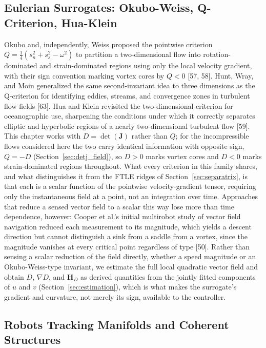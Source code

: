 \documentclass[12pt, letterpaper, oneside]{report}
\begin{document}
\subsection{Eulerian Surrogates: Okubo-Weiss, Q-Criterion, Hua-Klein}

Okubo and, independently, Weiss proposed the pointwise criterion
$Q=\tfrac14(s_n^2+s_s^2-\omega^2)$ to partition a two-dimensional flow into
rotation-dominated and strain-dominated regions using only the local
velocity gradient, with their sign convention marking vortex cores by
$Q<0$ [57, 58]. Hunt, Wray, and Moin generalized the same second-invariant
idea to three dimensions as the Q-criterion for identifying eddies,
streams, and convergence zones in turbulent flow fields [63]. Hua and Klein
revisited the two-dimensional criterion for oceanographic use, sharpening
the conditions under which it correctly separates elliptic and hyperbolic
regions of a nearly two-dimensional turbulent flow [59]. This chapter works
with $D=\det(\mathbf{J})$ rather than $Q$; for the incompressible flows
considered here the two carry identical information with opposite sign,
$Q=-D$ (Section~\ref{sec:detj_field}), so $D>0$ marks vortex cores and
$D<0$ marks strain-dominated regions throughout. What every criterion in
this family shares, and what distinguishes it from the FTLE ridges of
Section~\ref{sec:separatrix}, is that each is a scalar function of the
pointwise velocity-gradient tensor, requiring only the instantaneous field
at a point, not an integration over time. Approaches that reduce a sensed
vector field to a scalar this way lose more than time dependence, however:
Cooper et al.'s initial multirobot study of vector field navigation reduced
each measurement to its magnitude, which yields a descent direction but
cannot distinguish a sink from a saddle from a vortex, since the magnitude
vanishes at every critical point regardless of type [50]. Rather than
sensing a scalar reduction of the field directly, whether a speed magnitude
or an Okubo-Weiss-type invariant, we estimate the full local quadratic
vector field and obtain $D$, $\nabla D$, and $\mathbf{H}_D$ as derived
quantities from the jointly fitted components of $u$ and $v$
(Section~\ref{sec:estimation}), which is what makes the surrogate's
gradient and curvature, not merely its sign, available to the controller.

\subsection{Robots Tracking Manifolds and Coherent Structures}
\end{document}
